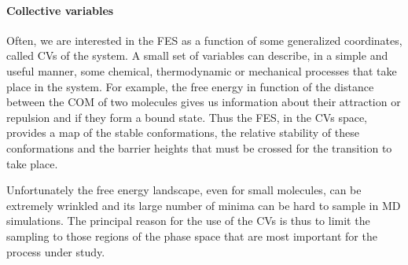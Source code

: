 \paragraph{\textbf{Collective variables}} Often, we are interested in the \ac{FES} as a function of some
generalized coordinates, called \acp{CV} of the system. A small set of variables can describe, in a simple
and useful manner, some chemical, thermodynamic or mechanical processes that take place in the system. For
example, the free energy in function of the distance between the \ac{COM} of two molecules gives us information
about their attraction or repulsion and if they form a bound state. Thus the \ac{FES}, in the \acp{CV} space,
provides a map of the stable conformations, the relative stability of these conformations and the barrier heights
that must be crossed for the transition to take place.

Unfortunately the free energy landscape, even for small molecules, can be extremely wrinkled and its large number 
of minima can be hard to sample in MD simulations. The principal reason for the use of the \acp{CV} is thus to 
limit the sampling to those regions of the phase space that are most important for the process under study.

